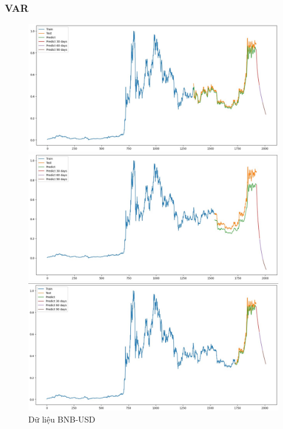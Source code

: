 \documentclass[conference]{IEEEtran}
\begin{document}
\subsubsection{VAR}
\begin{figure}[H]
    \centering
    \begin{minipage}{0.15\textwidth}
    \centering
    \includegraphics[width=1\textwidth]{Figure/LSTM_BNB_7.jpg}
    \end{minipage}
    \hfill
    \begin{minipage}{0.15\textwidth}
    \centering
    \includegraphics[width=1\textwidth]{Figure/LSTM_BNB_8.jpg}
    \end{minipage}
    \hfill
    \begin{minipage}{0.15\textwidth}
    \centering
    \includegraphics[width=1\textwidth]{Figure/LSTM_BNB_9.jpg}
    \end{minipage}
    \caption{Dữ liệu BNB-USD}
    \label{fig:1}
\end{figure}
\end{document}
